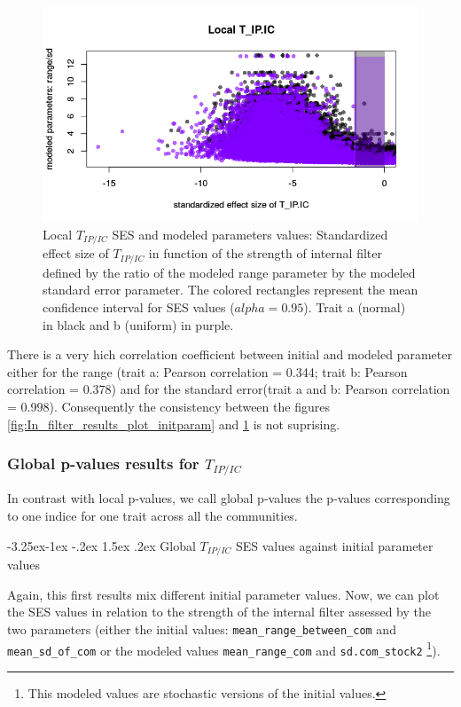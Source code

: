 \documentclass[12pt]{article}\usepackage[]{graphicx}\usepackage[]{color}
\makeatletter
\def\maxwidth{ %
  \ifdim\Gin@nat@width>\linewidth
    \linewidth
  \else
    \Gin@nat@width
  \fi
}
\newenvironment{knitrout}{}{} %
\newcounter {subsubsubsection}[subsubsection]
\newcommand\subsubsubsection{\@startsection{subsubsubsection}{4}{\z@}%
          {-3.25ex\@plus -1ex \@minus -.2ex}%
          {1.5ex \@plus .2ex}%
          {\normalfont\normalsize\bfseries}}
\makeatother
\begin{document}
\begin{knitrout}
\begin{figure}
{\centering \includegraphics[width=\maxwidth]{figure/In_filter_results_plot_modeledparam-1} 

}

\caption[Local $T_{IP/IC}$ SES and modeled parameters values]{Local $T_{IP/IC}$ SES and modeled parameters values: Standardized effect size of $T_{IP/IC}$ in function of the strength of internal filter defined by the ratio of the modeled range parameter by the modeled standard error parameter. The colored rectangles represent the mean confidence interval for SES values ($alpha = 0.95$). Trait a (normal) in black and b (uniform) in purple.}\label{fig:In_filter_results_plot_modeledparam}
\end{figure}


\end{knitrout}

There is a very hich correlation coefficient between initial and modeled parameter either for the range (trait a: Pearson correlation = 0.344; trait b: Pearson correlation = 0.378) and for the standard error(trait a and b: Pearson correlation = 0.998). Consequently the consistency between the figures \ref{fig:In_filter_results_plot_initparam} and  \ref{fig:In_filter_results_plot_modeledparam} is not suprising. 
 
 \subsubsection {Global p-values results for $T_{IP/IC}$}
In contrast with local p-values, we call global p-values the p-values corresponding to one indice for one trait across all the communities. 

  \subsubsubsection {Global $T_{IP/IC}$ SES values against initial parameter values}
  
Again, this first results mix different initial parameter values. Now, we can plot the SES values in relation to the strength of the internal filter assessed by the two parameters (either the initial values: \texttt{mean\_range\_between\_com} and \texttt{mean\_sd\_of\_com} or the modeled values \texttt{mean\_{}range\_{}com} and \texttt{sd.com\_{}stock2} \footnote{This modeled values are stochastic versions of the initial values.}). 
\end{document}
